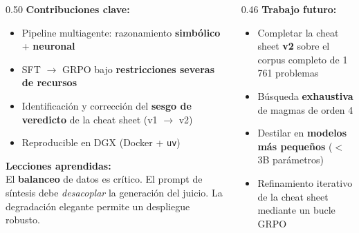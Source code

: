 \documentclass[aspectratio=169,10pt]{beamer}
\newcommand{\cy}[1]{\textcolor{AccentBlue}{\textbf{#1}}}
\newcommand{\gd}[1]{\textcolor{AccentGold}{\textbf{#1}}}
\begin{document}
{\begin{frame}[plain]
  \vspace{20mm}
  \begin{columns}[T,onlytextwidth]
    \begin{column}{0.50\textwidth}
      \cy{Contribuciones clave:}
      \vspace{2mm}
      \begin{itemize}\setlength\itemsep{3pt}
        \item[\textcolor{AccentGreen}{$\checkmark$}]
              Pipeline multiagente: razonamiento \textbf{simbólico} + \textbf{neuronal}
        \item[\textcolor{AccentGreen}{$\checkmark$}]
              SFT $\to$ GRPO bajo \textbf{restricciones severas de recursos}
        \item[\textcolor{AccentGreen}{$\checkmark$}]
              Identificación y corrección del \textbf{sesgo de veredicto} de la cheat sheet (v1 $\to$ v2)
        \item[\textcolor{AccentGreen}{$\checkmark$}]
              Reproducible en DGX (Docker + \texttt{uv})
      \end{itemize}
      \vspace{3mm}
      \cy{Lecciones aprendidas:}\\[2pt]
      \scriptsize El \textbf{balanceo} de datos es crítico. El prompt de síntesis debe
      \textit{desacoplar} la generación del juicio.
      La degradación elegante permite un despliegue robusto.
    \end{column}
    \hfill
    \begin{column}{0.46\textwidth}
      \gd{Trabajo futuro:}
      \vspace{2mm}
      \begin{itemize}\setlength\itemsep{3pt}
        \item[\textcolor{AccentGold}{$\triangleright$}]
              Completar la cheat sheet \textbf{v2} sobre el corpus completo de 1\,761 problemas
        \item[\textcolor{AccentGold}{$\triangleright$}]
              Búsqueda \textbf{exhaustiva} de magmas de orden 4
        \item[\textcolor{AccentGold}{$\triangleright$}]
              Destilar en \textbf{modelos más pequeños} ($<$3B parámetros)
        \item[\textcolor{AccentGold}{$\triangleright$}]
              Refinamiento iterativo de la cheat sheet mediante un bucle GRPO
      \end{itemize}
      \vspace{3mm}
    \end{column}
  \end{columns}
\end{frame}
}
\end{document}
